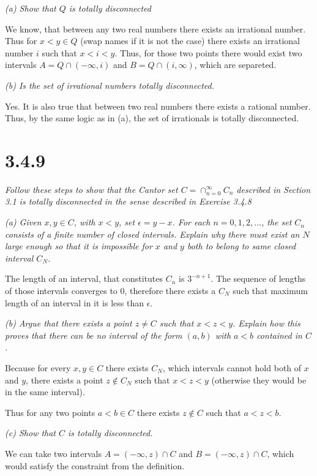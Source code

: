 \documentclass[11pt,oneside,titlepage]{article}
\begin{document}
\textit{(a) Show that $Q$ is totally disconnected}

We know, that between any two real numbers there exists an irrational number.
Thus for $x < y \in Q$ (swap names if it is not the case) there exists
an irrational number $i$ such that $x < i < y$. Thus, for those two points
there would exist two intervals $A = Q \cap (-\infty, i)$ and $B = Q \cap (i, \infty)$, which are separeted.

\textit{(b) Is the set of irrational numbers totally disconnected.}

Yes. It is also true that between two real numbers there exists a rational
number. Thus, by the same logic as in (a), the set of irrationals is totally
disconnected.

\section*{3.4.9}
\textit{Follow these steps to show that the Cantor set
  $C = \cap_{n = 0}^{\infty} C_n $ described in Section 3.1 is totally
  disconnected in the sense described in Exercise 3.4.8}

\textit{(a) Given $x, y \in C$, with $x < y$, set $\epsilon = y - x$. For
  each $n = 0, 1, 2,...$, the set $C_n$ consists of a finite number of closed
  intervals. Explain why there must exist an $N$ large enough so that it is
  impossible for $x$ and $y$ both to belong to same closed interval $C_N$.}

The length of an interval, that constitutes $C_n$ is $3^{-n + 1}$. The sequence
of lengths of those intervals converges to 0, therefore there exists
a $C_N$ such that maximum length of an interval in it is less than $\epsilon$.

\textit{(b) Argue that there exists a point $z \neq C$ such that $x < z < y$.
  Explain how this proves that there can be no interval of the form $(a,b)$
  with $a < b$ contained in $C$.}

Because for every $x, y \in C$ there exists $C_N$,
which intervals  cannot hold both
of $x$ and $y$, there exists a point $z \notin C_N$ such that $x < z < y$
(otherwise they would be in the same interval).

Thus for any two points $a< b \in C$ there exists $z \notin C$ such that
$a < z < b$.

\textit{(c) Show that $C$ is totally disconnected.}

We can take two intervals $A = (-\infty, z) \cap C$ and
$B = (-\infty, z) \cap C$, which would satisfy the constraint from the
definition.
\end{document}
